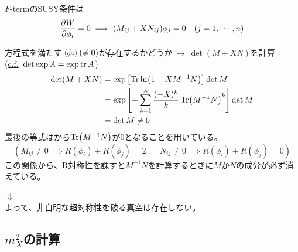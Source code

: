 \documentclass[
  unicode,a4paper,9pt,
  xcolor = {dvipsnames,svgnames},
  hyperref ={colorlinks=true,citecolor=Navy,linkcolor=NavyBlue,urlcolor=purple},
  ja=standard,lualatex
]{beamer}
\begin{document}
\begin{frame}

  $F$-termのSUSY条件は
  \begin{equation}
    \pdv{W}{\phi_{i}}
    =
    0
    \implies
    (M_{ij}+XN_{ij})\phi_{j}
    =
    0
    \quad
    (j=1,\cdots,n)
    \nonumber
  \end{equation}

  方程式を満たす$\ev*{\phi_{i}}(\neq 0)$が存在するかどうか$\ \rightarrow\ \det(M+XN)$を計算\\
  (\uline{c.f.}\ $\det\exp A=\exp\tr A$)
  \begin{align}
    \det (M+XN)
     & =
    \exp\left[ \Tr\ln (1+XM^{-1}N) \right]\det M
    \nonumber
    \\
     & =
    \exp\left[
      -\sum_{k=1}^{\infty}\frac{(-X)^{k}}{k}\Tr(M^{-1}N)^{k}
      \right]
    \det M
    \nonumber
    \\
     &
    =
    \det M\neq 0
    \nonumber
  \end{align}
  最後の等式はから$\Tr (M^{-1}N)$が$0$となることを用いている。
  \begin{equation}
    \left(
    M_{ij}\neq 0
    \implies
    R(\phi_{i})+R(\phi_{j})=2
    \ ,\quad
    N_{ij}\neq 0
    \implies
    R(\phi_{i})+R(\phi_{j})=0
    \right)
    \nonumber
  \end{equation}
  この関係から、R対称性を課すと$M^{-1}N$を計算するときに$M$か$N$の成分が必ず消えている。

  \begin{center}
    {\Huge $\Downarrow$}\\
    よって、非自明な超対称性を破る真空は存在しない。
  \end{center}

\end{frame}


\subsection{\texorpdfstring{$m_{X}^2$}{mX2}の計算}
\end{document}
